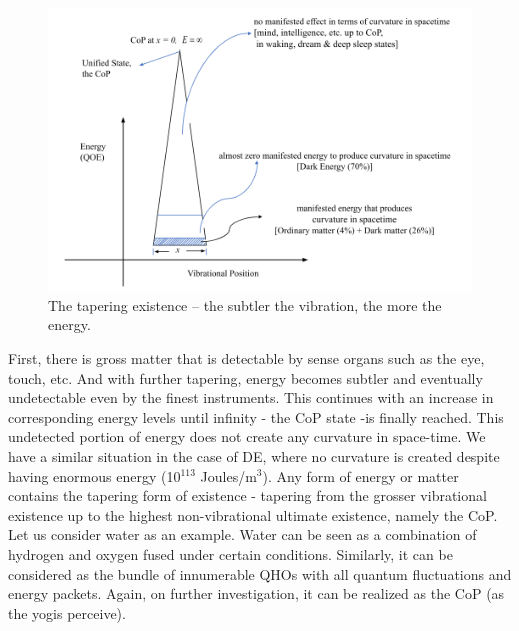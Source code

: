 \documentclass[twoside, 13pt]{article}
\begin{document}
{%

\begin{figure}[h]
\centering
\includegraphics[scale=.43]{images/003.png}
\caption{{\fontsize{10}{12}\selectfont The tapering existence – the subtler the vibration, the more the energy.}}\label{art1-fig2}
\end{figure}

{\fontsize{12}{14}\selectfont First, there is gross matter that is detectable by sense organs such as the eye, touch, etc. And with further tapering, energy becomes subtler and eventually undetectable even by the finest instruments. This continues with an increase in corresponding energy levels until infinity - the CoP state -is finally reached. This undetected portion of energy does not create any curvature in space-time. We have a similar situation in the case of DE, where no curvature is created despite having enormous energy (10$^{113}$ Joules/m$^{3}$). Any form of energy or matter contains the tapering form of existence - tapering from the grosser vibrational existence up to the highest non-vibrational ultimate existence, namely the CoP. Let us consider water as an example. Water can be seen as a combination of hydrogen and oxygen fused under certain conditions. Similarly, it can be considered as the bundle of innumerable QHOs with all quantum fluctuations and energy packets. Again, on further investigation, it can be realized as the CoP (as the yogis perceive).

}}
\end{document}
